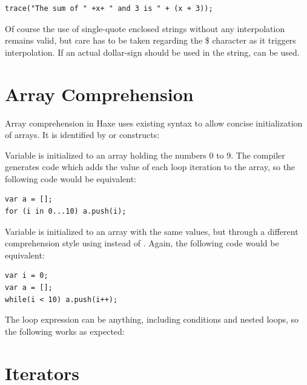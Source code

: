 \documentclass{haxe}
\begin{document}
\begin{lstlisting}
trace("The sum of " +x+ " and 3 is " + (x + 3));
\end{lstlisting}
Of course the use of single-quote enclosed strings without any interpolation remains valid, but care has to be taken regarding the \$ character as it triggers interpolation. If an actual dollar-sign should be used in the string, \expr{\$\$} can be used.



\section{Array Comprehension}
\label{lf-array-comprehension}


Array comprehension in Haxe uses existing syntax to allow concise initialization of arrays. It is identified by \expr{[for} or \expr{[while} constructs:


Variable  is initialized to an array holding the numbers 0 to 9. The compiler generates code which adds the value of each loop iteration to the array, so the following code would be equivalent:

\begin{lstlisting}
var a = [];
for (i in 0...10) a.push(i);
\end{lstlisting}

Variable  is initialized to an array with the same values, but through a different comprehension style using  instead of . Again, the following code would be equivalent:

\begin{lstlisting}
var i = 0;
var a = [];
while(i < 10) a.push(i++);
\end{lstlisting}

The loop expression can be anything, including conditions and nested loops, so the following works as expected:



\section{Iterators}
\label{lf-iterators}
\end{document}
